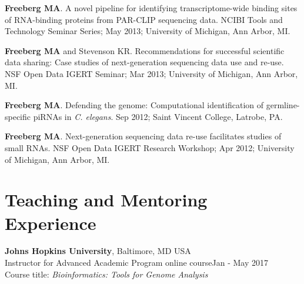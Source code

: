 \documentclass[margin,line]{res}
\begin{document}
\begin{resume}
{\bf Freeberg MA}. A novel pipeline for identifying transcriptome-wide binding sites of RNA-binding proteins from PAR-CLIP sequencing data. NCIBI Tools and Technology Seminar Series; May 2013; University of Michigan, Ann Arbor, MI.

{\bf Freeberg MA} and Stevenson KR. Recommendations for successful scientific data sharing: Case studies of next-generation sequencing data use and re-use. NSF Open Data IGERT Seminar; Mar 2013; University of Michigan, Ann Arbor, MI.

{\bf Freeberg MA}. Defending the genome: Computational identification of germline-specific piRNAs in {\em C. elegans}. Sep 2012; Saint Vincent College, Latrobe, PA.

{\bf Freeberg MA}. Next-generation sequencing data re-use facilitates studies of small RNAs. NSF Open Data IGERT Research Workshop; Apr 2012; University of Michigan, Ann Arbor, MI.


\section{\sc Teaching and Mentoring Experience}
{\bf Johns Hopkins University}, Baltimore, MD USA\\
Instructor for Advanced Academic Program online course\hfill {Jan - May 2017}\\
Course title: {\em Bioinformatics: Tools for Genome Analysis}


\end{resume}
\end{document}
